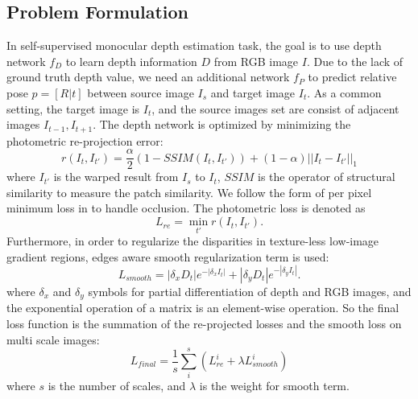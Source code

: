 \documentclass[letterpaper]{article} \usepackage{aaai21}  \usepackage{times}  \usepackage{helvet} \usepackage{courier}  \usepackage[hyphens]{url}  \usepackage{graphicx} \urlstyle{rm} \def\UrlFont{\rm}  \usepackage{natbib}  \usepackage{caption} \frenchspacing  \setlength{\pdfpagewidth}{8.5in}  \setlength{\pdfpageheight}{11in}  \usepackage{booktabs}
\begin{document}
\subsection{Problem Formulation}
In self-supervised monocular depth estimation task, the goal is to use depth network $f_D$ to learn depth information $D$ from RGB image $I$. Due to the lack of ground truth depth value, we need
an additional network $f_P$ to predict relative pose $p=[R|t]$ between source image $I_s$ and target image $I_t$. As a common setting, the target image is $I_t$, and the source images set are consist of adjacent images $I_{t-1}, I_{t+1}$.
The depth network is optimized by minimizing the photometric re-projection error:
\begin{equation}
    r(I_t, I_{t'}) = \frac{\alpha}{2}(1 - SSIM(I_t, I_{t'})) + (1 - \alpha)||I_t - I_{t'}||_1
\end{equation}
where $I_{t'}$ is the warped result from $I_s$ to $I_t$, $SSIM$ is the operator of structural similarity to measure the patch similarity. We follow the form of per pixel minimum loss in \cite{godard2019digging} to handle occlusion.
The photometric loss is denoted as
\begin{equation}
    L_{re} = \min\limits_{t'}r(I_t, I_{t'}).
\end{equation}
Furthermore, in order to regularize the disparities in texture-less low-image gradient regions, edges aware smooth regularization term is used: 
\begin{equation}
    L_{smooth} = |\delta_xD_t|e^{-|\delta_xI_t|} + |\delta_yD_t|e^{-|\delta_yI_t|}.
\end{equation} 
where $\delta_x$ and $\delta_y$ symbols for partial differentiation of depth and RGB images, and the exponential operation of a matrix is an element-wise operation.
So the final loss function is the summation of the re-projected losses and the smooth loss on multi scale images:
\begin{equation}
    L_{final} = \frac{1}{s}\sum_i^s(L^{i}_{re} + \lambda L^{i}_{smooth})
\end{equation}
where $s$ is the number of scales, and $\lambda$ is the weight for smooth term.
\end{document}
